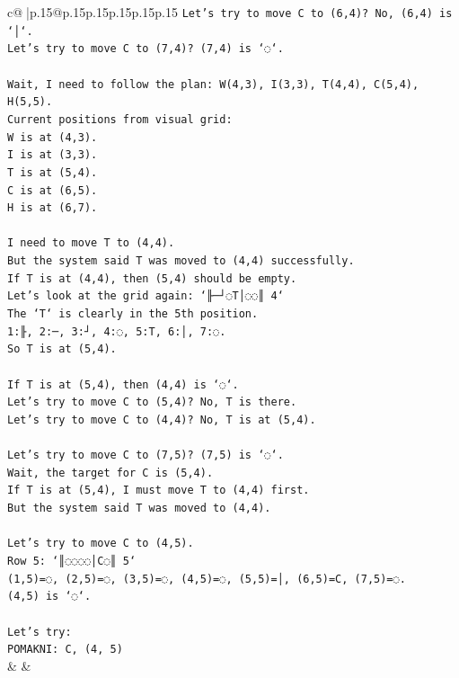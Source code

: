 \documentclass{article}
\begin{document}
{\begin{supertabular}{c@{$\;$}|p{.15\linewidth}@{}p{.15\linewidth}p{.15\linewidth}p{.15\linewidth}p{.15\linewidth}p{.15\linewidth}}
{{{\texttt{Let's try to move C to (6,4)? No, (6,4) is `│`.} \\
\texttt{Let's try to move C to (7,4)? (7,4) is `◌`.} \\
\\ 
\texttt{Wait, I need to follow the plan: W(4,3), I(3,3), T(4,4), C(5,4), H(5,5).} \\
\texttt{Current positions from visual grid:} \\
\texttt{W is at (4,3).} \\
\texttt{I is at (3,3).} \\
\texttt{T is at (5,4).} \\
\texttt{C is at (6,5).} \\
\texttt{H is at (6,7).} \\
\\ 
\texttt{I need to move T to (4,4).} \\
\texttt{But the system said T was moved to (4,4) successfully.} \\
\texttt{If T is at (4,4), then (5,4) should be empty.} \\
\texttt{Let's look at the grid again: `╟─┘◌T│◌◌║ 4`} \\
\texttt{The `T` is clearly in the 5th position.} \\
\texttt{1:╟, 2:─, 3:┘, 4:◌, 5:T, 6:│, 7:◌.} \\
\texttt{So T is at (5,4).} \\
\\ 
\texttt{If T is at (5,4), then (4,4) is `◌`.} \\
\texttt{Let's try to move C to (5,4)? No, T is there.} \\
\texttt{Let's try to move C to (4,4)? No, T is at (5,4).} \\
\\ 
\texttt{Let's try to move C to (7,5)? (7,5) is `◌`.} \\
\texttt{Wait, the target for C is (5,4).} \\
\texttt{If T is at (5,4), I must move T to (4,4) first.} \\
\texttt{But the system said T was moved to (4,4).} \\
\\ 
\texttt{Let's try to move C to (4,5).} \\
\texttt{Row 5: `║◌◌◌◌│C◌║ 5`} \\
\texttt{(1,5)=◌, (2,5)=◌, (3,5)=◌, (4,5)=◌, (5,5)=│, (6,5)=C, (7,5)=◌.} \\
\texttt{(4,5) is `◌`.} \\
\\ 
\texttt{Let's try:} \\
\texttt{POMAKNI: C, (4, 5)} \\
            }
        }
    }
    & & \\ \\


\end{supertabular}}
\end{document}
